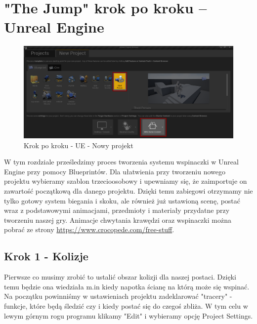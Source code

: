 \documentclass[brudnopis]{xmgr}
\begin{document}
\chapter{"The Jump" krok po kroku -- Unreal Engine}

\begin{figure}[!htb]
    \begin{center}
    \includegraphics[scale=0.35]{Screeny/UeKrokPoKroku/UE-Climb-NewProject.png}
    \end{center}
    \caption{Krok po kroku - UE - Nowy projekt}
\end{figure}

W tym rozdziale prześledzimy proces tworzenia systemu wspinaczki w Unreal Engine przy pomocy Blueprintów. Dla ułatwienia przy tworzeniu nowego projektu wybieramy szablon trzecioosobowy i upewniamy się, że zaimportuje on zawartość początkową dla danego projektu. Dzięki temu zabiegowi otrzymamy nie tylko gotowy system biegania i skoku, ale również już ustawioną scenę, postać wraz z podstawowymi animacjami, przedmioty i materiały przydatne przy tworzeniu naszej gry. Animacje chwytania krawędzi oraz wspinaczki można pobrać ze strony \url{https://www.crocopede.com/free-stuff}.

\section{Krok 1 - Kolizje}

Pierwsze co musimy zrobić to ustalić obszar kolizji dla naszej postaci. Dzięki temu będzie ona wiedziała m.in kiedy napotka ścianę na którą może się wspinać. Na początku powinniśmy w ustawieniach projektu zadeklarować "tracery" - funkcje, które będą śledzić czy i kiedy postać się do czegoś zbliża. W tym celu w lewym górnym rogu programu klikamy "Edit" i wybieramy opcję Project Settings. 
\end{document}
